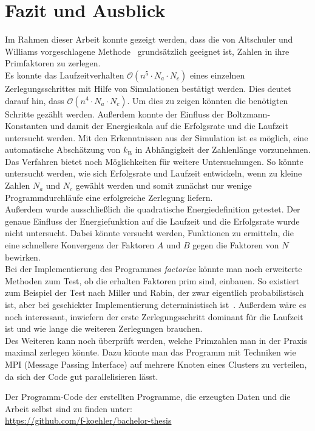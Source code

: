 \chapter{Fazit und Ausblick}\label{ch:conclusion}
Im Rahmen dieser Arbeit konnte gezeigt werden, dass die von Altschuler und Williams vorgeschlagene Methode~\parencite{altschuler} grundsätzlich geeignet ist, Zahlen in ihre Primfaktoren zu zerlegen. \\
Es konnte das Laufzeitverhalten $\mathcal{O}\left(n^5\cdot N_a \cdot N_c\right)$ eines einzelnen Zerlegungsschrittes mit Hilfe von Simulationen bestätigt werden. Dies deutet darauf hin, dass $\mathcal{O}\left(n^4\cdot N_a\cdot N_c\right)$. Um dies zu zeigen könnten die benötigten Schritte gezählt werden. Außerdem konnte der Einfluss der Boltzmann-Konstanten und damit der Energieskala auf die Erfolgsrate und die Laufzeit untersucht werden. Mit den Erkenntnissen aus der Simulation ist es möglich, eine automatische Abschätzung von $k_\mathrm{B}$ in Abhängigkeit der Zahlenlänge vorzunehmen. \\
Das Verfahren bietet noch Möglichkeiten für weitere Untersuchungen. So könnte untersucht werden, wie sich Erfolgsrate und Laufzeit entwickeln, wenn zu kleine Zahlen $N_a$ und $N_c$ gewählt werden und somit zunächst nur wenige Programmdurchläufe eine erfolgreiche Zerlegung liefern. \\
Außerdem wurde ausschließlich die quadratische Energiedefinition getestet. Der genaue Einfluss der Energiefunktion auf die Laufzeit und die Erfolgsrate wurde nicht untersucht. Dabei könnte versucht werden, Funktionen zu ermitteln, die eine schnellere Konvergenz der Faktoren $A$ und $B$ gegen die Faktoren von $N$ bewirken.  \\
Bei der Implementierung des Programmes \textit{factorize} könnte man noch erweiterte Methoden zum Test, ob die erhalten Faktoren prim sind, einbauen. So existiert zum Beispiel der Test nach Miller und Rabin, der zwar eigentlich probabilistisch ist, aber bei geschickter Implementierung deterministisch ist~\parencite{miller}. Außerdem wäre es noch interessant, inwiefern der erste Zerlegungsschritt dominant für die Laufzeit ist und wie lange die weiteren Zerlegungen brauchen. \\
Des Weiteren kann noch überprüft werden, welche Primzahlen man in der Praxis maximal zerlegen könnte. Dazu könnte man das Programm mit Techniken wie MPI (Message Passing Interface) auf mehrere Knoten eines Clusters zu verteilen, da sich der Code gut parallelisieren lässt.

\vfill
Der Programm-Code der erstellten Programme, die erzeugten Daten und die Arbeit selbst sind zu finden unter:\\
\url{https://github.com/f-koehler/bachelor-thesis}
